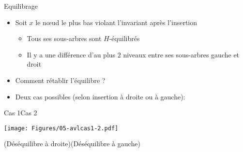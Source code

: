 


\begin{frame}{Equilibrage}

\begin{itemize}
\item Soit $x$ le n\oe ud le plus bas violant l'invariant après l'insertion
  \begin{itemize}
  \item Tous ses sous-arbres sont $H$-équilibrés
  \item Il y a une différence d'au plus 2 niveaux entre ses
    sous-arbres gauche et droit
  \end{itemize}
\item Comment rétablir l'équilibre ?
\item Deux cas possibles (selon insertion à droite ou à gauche):
\end{itemize}
\begin{center}
Cas 1\hspace{4cm}Cas 2

\medskip

\texttt{[image: Figures/05-avlcas1-2.pdf]}

\medskip
(Déséquilibre à droite)\hspace{1.3cm}(Déséquilibre à gauche)
\end{center}


\end{frame}

